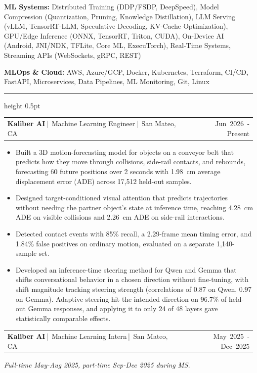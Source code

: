 \documentclass[letterpaper]{article}
\makeatletter
\newcommand{\ressection}[1]{\par\vspace{3pt}{\fontsize{9}{10}\selectfont\bfseries #1}\par\vspace{1pt}\hrule height 0.5pt\vspace{1.25pt}}
\newcommand{\job}[4]{\par\vspace{1.25pt}\noindent
\begin{tabularx}{\linewidth}{@{}>{\RaggedRight\arraybackslash}X@{\hspace{8pt}}r@{}}
\textbf{#1}\,|\, #2\,|\, #3 & \mbox{#4}
\end{tabularx}\par}
\makeatother
\begin{document}
\textbf{ML Systems:} Distributed Training (DDP/FSDP, DeepSpeed), Model Compression (Quantization, Pruning, Knowledge Distillation), LLM Serving (vLLM, TensorRT-LLM, Speculative Decoding, KV-Cache Optimization), GPU/Edge Inference (ONNX, TensorRT, Triton, CUDA), On-Device AI (Android, JNI/NDK, TFLite, Core ML, ExecuTorch), Real-Time Systems, Streaming APIs (WebSockets, gRPC, REST)\par\vspace{0.25pt}
\textbf{MLOps \& Cloud:} AWS, Azure/GCP, Docker, Kubernetes, Terraform, CI/CD, FastAPI, Microservices, Data Pipelines, ML Monitoring, Git, Linux
\ressection{WORK EXPERIENCE}
\job{Kaliber AI}{Machine Learning Engineer}{San Mateo, CA}{Jun 2026 - Present}
\begin{itemize}
\item Built a 3D motion-forecasting model for objects on a conveyor belt that predicts how they move through collisions, side-rail contacts, and rebounds, forecasting 60 future positions over 2 seconds with 1.98~cm average displacement error (ADE) across 17,512 held-out samples.
\item Designed target-conditioned visual attention that predicts trajectories without needing the partner object's state at inference time, reaching 4.28~cm ADE on visible collisions and 2.26~cm ADE on side-rail interactions.
\item Detected contact events with 85\% recall, a 2.29-frame mean timing error, and 1.84\% false positives on ordinary motion, evaluated on a separate 1,140-sample set.
\item Developed an inference-time steering method for Qwen and Gemma that shifts conversational behavior in a chosen direction without fine-tuning, with shift magnitude tracking steering strength (correlations of 0.87 on Qwen, 0.97 on Gemma). Adaptive steering hit the intended direction on 96.7\% of held-out Gemma responses, and applying it to only 24 of 48 layers gave statistically comparable effects.
\end{itemize}
\job{Kaliber AI}{Machine Learning Intern}{San Mateo, CA}{May 2025 - Dec 2025}
\textit{Full-time May-Aug 2025, part-time Sep-Dec 2025 during MS.}\par
\end{document}
